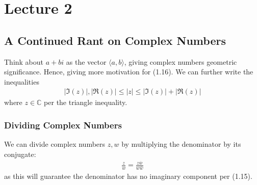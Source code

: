\section{Lecture 2}
\subsection{A Continued Rant on Complex Numbers}
Think about $a+bi$ as the vector $\langle a, b \rangle$, giving complex numbers geometric significance. Hence, giving more motivation for (1.16). We can further write the inequalities
\begin{align}
    |\Im(z)|, |\Re(z)| \le |z| \le |\Im(z)| + |\Re(z)|
\end{align}
where $z \in \mathbb{C}$ per the triangle inequality.
\subsubsection{Dividing Complex Numbers}
We can divide complex numbers $z, w$ by multiplying the denominator by its conjugate:
\begin{align}
    \frac{z}{w} = \frac{z\overline{w}}{w \overline{w}}
\end{align}
as this will guarantee the denominator has no imaginary component per (1.15).


